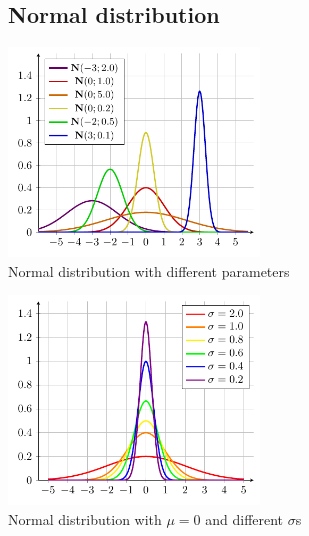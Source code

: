 \documentclass[a4paper]{article}
\begin{document}
	\subsection{Normal distribution}
		\begin{multicols}{2}
		\centering
		\includegraphics[width=0.5\textwidth]{normal_distributions}\\
		Normal distribution with different parameters
				
		\includegraphics[width=0.5\textwidth]{normal_distributions_different_sigma}\\
		Normal distribution with $\mu=0$ and different $\sigma$s
		\end{multicols}
		
\end{document}

